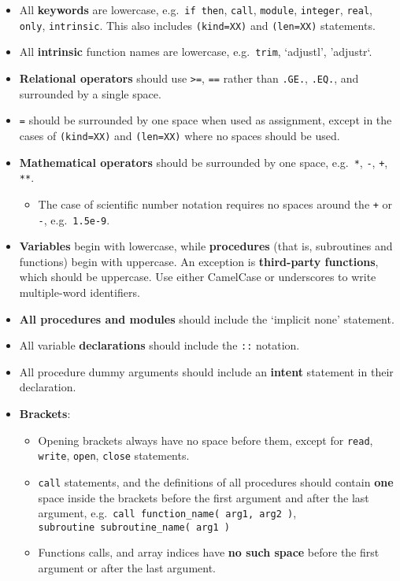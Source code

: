 \begin{itemize}
\tightlist
\item
  All \textbf{keywords} are lowercase, e.g.~\texttt{if\ then},
  \texttt{call}, \texttt{module}, \texttt{integer}, \texttt{real},
  \texttt{only}, \texttt{intrinsic}. This also includes
  \texttt{(kind=XX)} and \texttt{(len=XX)} statements.
\item
  All \textbf{intrinsic} function names are lowercase,
  e.g.~\texttt{trim}, `adjustl', 'adjustr`.
\item
  \textbf{Relational operators} should use \texttt{\textgreater{}=},
  \texttt{==} rather than \texttt{.GE.}, \texttt{.EQ.}, and surrounded
  by a single space.
\item
  \texttt{=} should be surrounded by one space when used as assignment,
  except in the cases of \texttt{(kind=XX)} and \texttt{(len=XX)} where
  no spaces should be used.
\item
  \textbf{Mathematical operators} should be surrounded by one space,
  e.g.~\texttt{*}, \texttt{-}, \texttt{+}, \texttt{**}.

  \begin{itemize}
  \tightlist
  \item
    The case of scientific number notation requires no spaces around the
    \texttt{+} or \texttt{-}, e.g.~\texttt{1.5e-9}.
  \end{itemize}
\item
  \textbf{Variables} begin with lowercase, while \textbf{procedures}
  (that is, subroutines and functions) begin with uppercase. An
  exception is \textbf{third-party functions}, which should be
  uppercase. Use either CamelCase or underscores to write multiple-word
  identifiers.
\item
  \textbf{All procedures and modules} should include the `implicit none'
  statement.
\item
  All variable \textbf{declarations} should include the \texttt{::}
  notation.
\item
  All procedure dummy arguments should include an \textbf{intent}
  statement in their declaration.
\item
  \textbf{Brackets}:

  \begin{itemize}
  \tightlist
  \item
    Opening brackets always have no space before them, except for
    \texttt{read}, \texttt{write}, \texttt{open}, \texttt{close}
    statements.
  \item
    \texttt{call} statements, and the definitions of all procedures
    should contain \textbf{one} space inside the brackets before the
    first argument and after the last argument,
    e.g.~\texttt{call\ function\_name(\ arg1,\ arg2\ )},
    \texttt{subroutine\ subroutine\_name(\ arg1\ )}
  \item
    Functions calls, and array indices have \textbf{no such space}
    before the first argument or after the last argument.
  \end{itemize}
\end{itemize}
